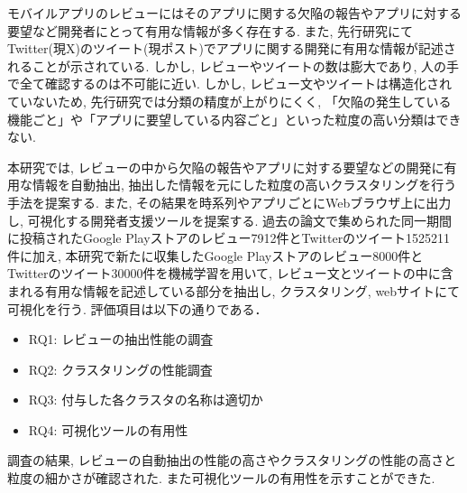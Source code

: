
モバイルアプリのレビューにはそのアプリに関する欠陥の報告やアプリに対する要望など開発者にとって有用な情報が多く存在する. また, 先行研究にてTwitter(現X)のツイート(現ポスト)でアプリに関する開発に有用な情報が記述されることが示されている. しかし, レビューやツイートの数は膨大であり, 人の手で全て確認するのは不可能に近い. 
しかし, レビュー文やツイートは構造化されていないため, 先行研究では分類の精度が上がりにくく, 「欠陥の発生している機能ごと」や「アプリに要望している内容ごと」といった粒度の高い分類はできない. 

本研究では, レビューの中から欠陥の報告やアプリに対する要望などの開発に有用な情報を自動抽出, 抽出した情報を元にした粒度の高いクラスタリングを行う手法を提案する. また, その結果を時系列やアプリごとにWebブラウザ上に出力し, 可視化する開発者支援ツールを提案する.
過去の論文で集められた同一期間に投稿されたGoogle Playストアのレビュー7912件とTwitterのツイート1525211件に加え, 本研究で新たに収集したGoogle Playストアのレビュー8000件とTwitterのツイート30000件を機械学習を用いて, レビュー文とツイートの中に含まれる有用な情報を記述している部分を抽出し, クラスタリング, webサイトにて可視化を行う. 評価項目は以下の通りである．
\begin{itemize}
    \item RQ1: レビューの抽出性能の調査
    \item RQ2: クラスタリングの性能調査
    \item RQ3: 付与した各クラスタの名称は適切か
    \item RQ4: 可視化ツールの有用性
\end{itemize}

調査の結果, レビューの自動抽出の性能の高さやクラスタリングの性能の高さと粒度の細かさが確認された. また可視化ツールの有用性を示すことができた. 
